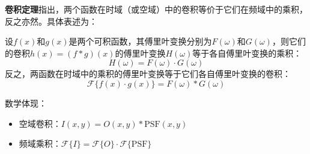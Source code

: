     \textbf{卷积定理}指出，两个函数在时域（或空域）中的卷积等价于它们在频域中的乘积，反之亦然。具体表述为：

设$f(x)$和$g(x)$是两个可积函数，其傅里叶变换分别为$F(\omega)$和$G(\omega)$，则它们的卷积$h(x) = (f * g)(x)$的傅里叶变换$H(\omega)$等于各自傅里叶变换的乘积：
$$
H(\omega) = F(\omega) \cdot G(\omega)
$$
反之，两函数在时域中的乘积的傅里叶变换等于它们各自傅里叶变换的卷积：
$$
\mathcal{F}\{f(x) \cdot g(x)\} = F(\omega) * G(\omega)
$$

数学体现：
    \begin{itemize}
        \item 空域卷积：$I(x,y) = O(x,y) \ast \text{PSF}(x,y)$  
        \item 频域乘积：$\mathcal{F}\{I\} = \mathcal{F}\{O\} \cdot \mathcal{F}\{\text{PSF}\}$  
    \end{itemize}
    

